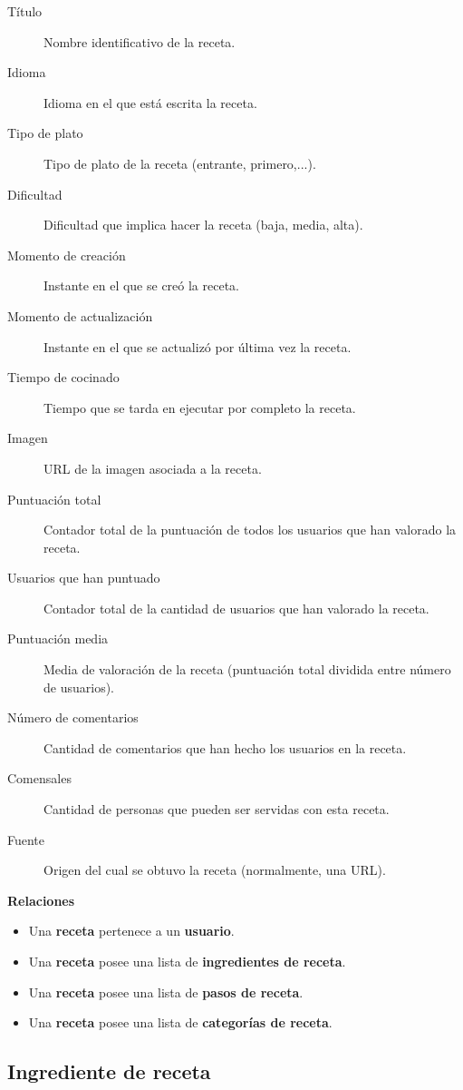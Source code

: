 \begin{description}
\item[Título] Nombre identificativo de la receta.
\item[Idioma] Idioma en el que está escrita la receta.
\item[Tipo de plato] Tipo de plato de la receta (entrante, primero,...).
\item[Dificultad] Dificultad que implica hacer la receta (baja, media, alta).
\item[Momento de creación] Instante en el que se creó la receta.
\item[Momento de actualización] Instante en el que se actualizó por última vez
la receta.
\item[Tiempo de cocinado] Tiempo que se tarda en ejecutar por completo la receta.
\item[Imagen] URL de la imagen asociada a la receta.
\item[Puntuación total] Contador total de la puntuación de todos los usuarios que
han valorado la receta.
\item[Usuarios que han puntuado] Contador total de la cantidad de usuarios que
han valorado la receta.
\item[Puntuación media] Media de valoración de la receta (puntuación total
dividida entre número de usuarios).
\item[Número de comentarios] Cantidad de comentarios que han hecho los usuarios
en la receta.
\item[Comensales] Cantidad de personas que pueden ser servidas con esta receta.
\item[Fuente] Origen del cual se obtuvo la receta (normalmente, una URL).
\end{description}

\textbf{Relaciones}
\begin{itemize}
\item Una \textbf{receta} pertenece a un \textbf{usuario}.
\item Una \textbf{receta} posee una lista de \textbf{ingredientes de receta}.
\item Una \textbf{receta} posee una lista de \textbf{pasos de receta}.
\item Una \textbf{receta} posee una lista de \textbf{categorías de receta}.
\end{itemize}


\subsection{Ingrediente de receta}

